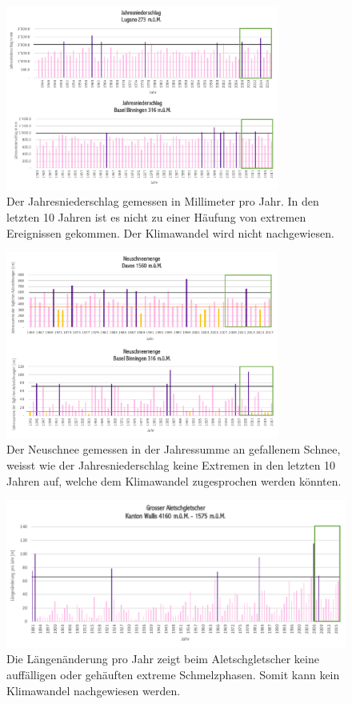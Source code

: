 \begin{refsection}
\begin{figure}
\centering
\includegraphics[width=0.8\textwidth]{extrem/Jahresniederschlag.pdf}
\caption{Der Jahresniederschlag gemessen in Millimeter pro Jahr. In den letzten 10 Jahren ist es nicht zu einer Häufung von extremen Ereignissen gekommen. Der Klimawandel wird nicht nachgewiesen.}
\label{Jahresniederschlag}
\end{figure}


\begin{figure}
\centering
\includegraphics[width=0.8\textwidth]{extrem/Neuschnee.pdf}
\caption{Der Neuschnee gemessen in der Jahressumme an gefallenem Schnee, weisst wie der Jahresniederschlag keine Extremen in den letzten 10 Jahren auf, welche dem Klimawandel zugesprochen werden könnten.}
\label{Neuschnee}
\end{figure}


\begin{figure}
\centering
\includegraphics[width=1.0\textwidth]{extrem/Aletsch.pdf}
\caption{Die Längenänderung pro Jahr zeigt beim Aletschgletscher keine auffälligen oder gehäuften extreme Schmelzphasen. Somit kann kein Klimawandel nachgewiesen werden.}
\label{AletschTab}
\end{figure}



\end{refsection}
